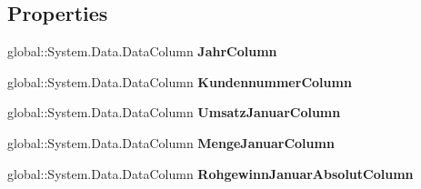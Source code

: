\subsection*{Properties}
\begin{DoxyCompactItemize}
\item 
global\+::\+System.\+Data.\+Data\+Column {\bfseries Jahr\+Column}\hypertarget{class_products_1_1_data_1_1ds_sage_1_1_kundenumsatz_basis_data_table_a01032387f300e978ab745d1081d675ec}{}\label{class_products_1_1_data_1_1ds_sage_1_1_kundenumsatz_basis_data_table_a01032387f300e978ab745d1081d675ec}

\item 
global\+::\+System.\+Data.\+Data\+Column {\bfseries Kundennummer\+Column}\hypertarget{class_products_1_1_data_1_1ds_sage_1_1_kundenumsatz_basis_data_table_adb82ee31d4ed15e489f121f590e17760}{}\label{class_products_1_1_data_1_1ds_sage_1_1_kundenumsatz_basis_data_table_adb82ee31d4ed15e489f121f590e17760}

\item 
global\+::\+System.\+Data.\+Data\+Column {\bfseries Umsatz\+Januar\+Column}\hypertarget{class_products_1_1_data_1_1ds_sage_1_1_kundenumsatz_basis_data_table_abda2b578a168de0ed0fecce8fc895e19}{}\label{class_products_1_1_data_1_1ds_sage_1_1_kundenumsatz_basis_data_table_abda2b578a168de0ed0fecce8fc895e19}

\item 
global\+::\+System.\+Data.\+Data\+Column {\bfseries Menge\+Januar\+Column}\hypertarget{class_products_1_1_data_1_1ds_sage_1_1_kundenumsatz_basis_data_table_afba597132c1c3fb055b926707d4e20b9}{}\label{class_products_1_1_data_1_1ds_sage_1_1_kundenumsatz_basis_data_table_afba597132c1c3fb055b926707d4e20b9}

\item 
global\+::\+System.\+Data.\+Data\+Column {\bfseries Rohgewinn\+Januar\+Absolut\+Column}\hypertarget{class_products_1_1_data_1_1ds_sage_1_1_kundenumsatz_basis_data_table_a2ccfaaad238845065ffb5129dcc0c200}{}\label{class_products_1_1_data_1_1ds_sage_1_1_kundenumsatz_basis_data_table_a2ccfaaad238845065ffb5129dcc0c200}


\end{DoxyCompactItemize}
